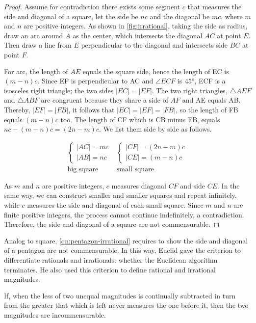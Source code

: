 \documentclass[b5paper]{article}
\begin{document}
\begin{proof}
Assume for contradiction there exists some segment $c$ that measures the side and diagonal of a square, let the side be $nc$ and the diagonal be $mc$, where $m$ and $n$ are positive integers. As shown in \cref{fig:irrational}, taking the side as radius, draw an arc around $A$ as the center, which intersects the diagonal $AC$ at point $E$. Then draw a line from $E$ perpendicular to the diagonal and intersects side $BC$ at point $F$.

For arc, the length of $AE$ equals the square side, hence the length of EC is $(m - n)c$. Since EF is perpendicular to AC and $\angle ECF$ is $45\degree$, ECF is a isosceles right triangle; the two sides $|EC| = |EF|$. The two right triangles, $\triangle AEF$ and $\triangle ABF$ are congruent because they share a side of $AF$ and AE equals AB. Thereby, $|EF| = |FB|$, it follows that $|EC| = |EF| = |FB|$, so the length of FB equals $(m - n)c$ too. The length of CF which is CB minus FB, equals $nc - (m - n)c = (2n - m)c$. We list them side by side as follows.

\[
\begin{array}{c|c}
\begin{cases}
|AC| = mc \\
|AB| = nc
\end{cases} &
\begin{cases}
|CF| = (2n - m)c \\
|CE| = (m - n)c
\end{cases} \\[4ex]
\text{big square} & \text{small square}
\end{array}
\]

As $m$ and $n$ are positive integers, $c$ measures diagonal $CF$ and side $CE$. In the same way, we can construct smaller and smaller squares and repeat infinitely, while $c$ measures the side and diagonal of each small square. Since $m$ and $n$ are finite positive integers, the process cannot continue indefinitely, a contradiction. Therefore, the side and diagonal of a square are not commensurable.
\end{proof}

Analog to square, \cref{qn:pentagon-irrational} requires to show the side and diagonal of a pentagon are not commensurable. In this way, Euclid gave the criterion to differentiate rationals and irrationals: whether the Euclidean algorithm terminates. He also used this criterion to define rational and irrational magnitudes.

\begin{proposition} \label{th:irrational-gcm}
If, when the less of two unequal magnitudes is continually subtracted in turn from the greater that which is left never measures the one before it, then the two magnitudes are incommensurable.
\end{proposition}
\end{document}
